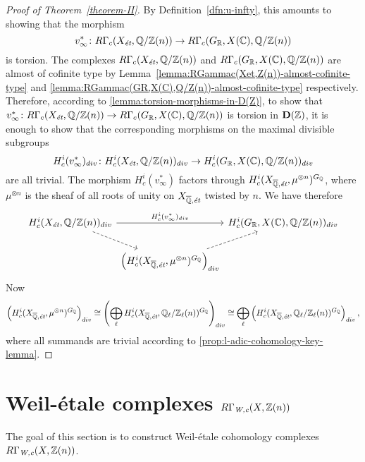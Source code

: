 \documentclass{article}
\numberwithin{equation}{section}
\begin{document}
\begin{proof}[Proof of Theorem~\ref{theorem-II}]
  By Definition~\ref{dfn:u-infty}, this amounts to showing that the morphism
  $$v_\infty^*\colon R\Gamma_c (X_\et, \QQ/\ZZ (n)) \to R\Gamma_c (G_\RR, X (\CC), \QQ/\ZZ (n))$$
  is torsion. The complexes $R\Gamma_c (X_\et, \QQ/\ZZ (n))$ and
  $R\Gamma_c (G_\RR, X (\CC), \QQ/\ZZ (n))$ are almost of cofinite type by
  Lemma~\ref{lemma:RGammac(Xet,Z(n))-almost-cofinite-type} and
  \ref{lemma:RGammac(GR,X(C),Q/Z(n))-almost-cofinite-type} respectively.
  Therefore, according to \ref{lemma:torsion-morphisms-in-D(Z)}, to show that
  $v^*_\infty\colon R\Gamma_c (X_\et, \QQ/\ZZ (n)) \to R\Gamma_c (G_\RR, X
  (\CC), \QQ/\ZZ (n))$ is torsion in $\mathbf{D} (\ZZ)$, it is enough to show
  that the corresponding morphisms on the maximal divisible subgroups
  \[ H^i_c (v^*_\infty)_{div}\colon H^i_c (X_\et, \QQ/\ZZ (n))_{div} \to
     H^i_c (G_\RR, X (\CC), \QQ/\ZZ (n))_{div} \]
  are all trivial. The morphism $H^i_c (v^*_\infty)$ factors through
  $H^i_c (X_{\overline{\QQ}, \text{\it ét}}, \mu^{\otimes n})^{G_\QQ}$, where
  $\mu^{\otimes n}$ is the sheaf of all roots of unity on
  $X_{\overline{\QQ}, \text{\it ét}}$ twisted by $n$.
  We have therefore
  \[ \begin{tikzcd}[column sep=0pt]
    H^i_c (X_\et, \QQ/\ZZ (n))_{div}\ar{rr}{H^i_c (v^*_\infty)_{div}}\ar[dashed]{dr} && H^i_c (G_\RR, X (\CC), \QQ/\ZZ (n))_{div}\\
    & \left(H^i_c (X_{\overline{\QQ}, \text{\it ét}}, \mu^{\otimes n})^{G_\QQ}\right)_{div}\ar[dashed]{ur}
  \end{tikzcd} \]
  Now
  \[ \left(H^i_c (X_{\overline{\QQ}, \text{\it ét}}, \mu^{\otimes n})^{G_\QQ}\right)_{div} \cong
  \left(\bigoplus_\ell H^i_c (X_{\overline{\QQ}, \text{\it ét}}, \QQ_\ell/\ZZ_\ell (n))^{G_\QQ}\right)_{div} \cong
  \bigoplus_\ell \left(H^i_c (X_{\overline{\QQ}, \text{\it ét}}, \QQ_\ell/\ZZ_\ell (n))^{G_\QQ}\right)_{div}, \]
  where all summands are trivial according to
  \ref{prop:l-adic-cohomology-key-lemma}.
\end{proof}


\section{Weil-étale complexes $R\Gamma_\Wc (X, \ZZ(n))$}
\label{sec:RGamma-Wc}

The goal of this section is to construct Weil-étale cohomology complexes
$R\Gamma_\Wc (X, \ZZ(n))$.
\end{document}
